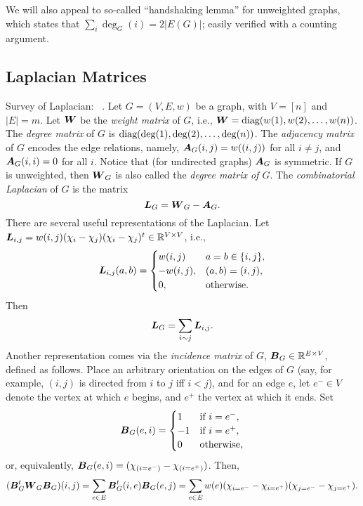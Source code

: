 We will also appeal to so-called ``handshaking lemma'' for unweighted graphs, which states that $\sum_i \deg_G(i) = 2|E(G)|$; easily verified with a counting argument. 





\subsection{Laplacian Matrices}
Survey of Laplacian: ~\cite{merris1994laplacian}.  
Let $G=(V,E,w)$ be a graph, with $V=[n]$ and $|E|=m$. 
Let $\vb*{W}$ be the \emph{weight matrix} of $G$, i.e., $\vb*{W}=\text{diag}(w(1),w(2),\dots,w(n))$. 
The \emph{degree matrix} of $G$ is $\text{diag}(\deg(1),\deg(2),\dots,\deg(n))$. The \emph{adjacency matrix} of $G$ encodes the edge relations, namely, $\vb*{A}_G(i,j)=w((i,j))$ for all $i\neq j$, and $\vb*{A}_G(i,i)=0$ for all $i$. Notice that (for undirected graphs) $\vb*{A}_G$ is symmetric.  If $G$ is unweighted, then $\vb*{W}_G$ is also called the \emph{degree matrix of $G$}. 
The \emph{combinatorial Laplacian} of $G$ is the matrix 
\begin{equation}
\label{eq:L_G}
\vb*{L}_G=\vb*{W}_G-\vb*{A}_G.
\end{equation}
There are several useful representations of the Laplacian. Let $\vb*{L}_{i,j}=w(i,j)(\chi_i-\chi_j) (\chi_i-\chi_j)^t\in \mathbb{R}^{V\times V}$, i.e., 
\[\vb*{L}_{i,j}(a,b)=\begin{cases}
w(i,j)&a=b\in\{i,j\},\\
-w(i,j),&(a,b)=(i,j),\\
0,&\text{otherwise}.
\end{cases}\]
Then 
\begin{equation}
\label{eq:Lsum}
    \vb*{L}_G=\sum_{i\sim j}\vb*{L}_{i,j}.
\end{equation}
Another representation comes via the \emph{incidence matrix} of $G$, $\vb*{B}_G\in \mathbb{R}^{E\times V}$, defined as follows. Place an arbitrary orientation on the edges of $G$ (say, for example, $(i,j)$ is directed from $i$ to $j$ iff $i<j$), and for an edge $e$, let $e^-\in V$ denote the vertex at which $e$ begins, and $e^+$ the vertex at which it ends. Set 
\[\vb*{B}_G(e,i)=\begin{cases}
1&\text{if }i=e^-,\\
-1&\text{if }i=e^+,\\
0&\text{otherwise},
\end{cases}\]
or, equivalently, $\vb*{B}_G(e,i) = (\chi_{(i=e^-)}-\chi_{(i=e^+)})$. Then,
\begin{equation*}
   ( \vb*{B}_G^t\vb*{W}_G\vb*{B}_G)(i,j)=\sum_{e\in E} \vb*{B}_G^t(i,e)\vb*{B}_G(e,j)=\sum_{e\in E}w(e)(\chi_{i=e^-}-\chi_{i=e^+})(\chi_{j=e^-}-\chi_{j=e^+}).
\end{equation*}
